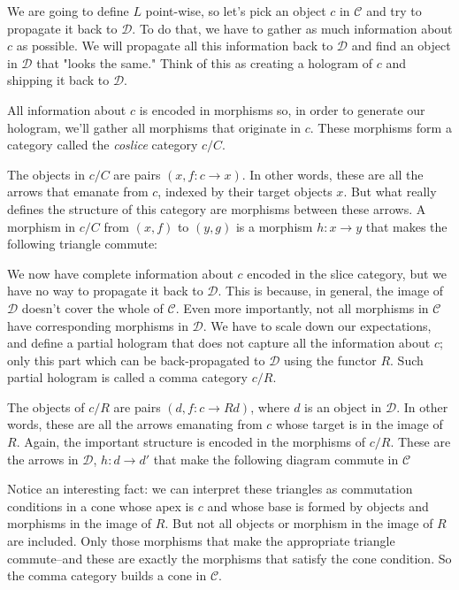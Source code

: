 \documentclass[11pt]{amsart}
\begin{document}
We are going to define $L$ point-wise, so let's pick an object $c$ in $\mathcal C$ and try to propagate it back to $\mathcal D$. To do that, we have to gather as much information about $c$ as possible. We will propagate all this information back to $\mathcal D$ and find an object in $\mathcal D$ that "looks the same." Think of this as creating a hologram of $c$ and shipping it back to $\mathcal D$. 

All information about $c$ is encoded in morphisms so, in order to generate our hologram, we'll gather all morphisms that originate in $c$. These morphisms form a category called the \emph{coslice} category $c/C$. 

The objects in $c/C$ are pairs $(x, f \colon c \to x)$. In other words, these are all the arrows that emanate from $c$, indexed by their target objects $x$. But what really defines the structure of this category are morphisms between these arrows. A morphism in $c/C$ from $(x, f)$ to $(y, g)$ is a morphism $h \colon x \to y$ that makes the following triangle commute:

\begin{figure}[H]
\centering
\end{figure}

We now have complete information about $c$ encoded in the slice category, but we have no way to propagate it back to $\mathcal D$. This is because, in general, the image of $\mathcal D$ doesn't cover the whole of $\mathcal C$. Even more importantly, not all morphisms in $\mathcal C$ have corresponding morphisms in $\mathcal D$. We have to scale down our expectations, and define a partial hologram that does not capture all the information about $c$; only this part which can be back-propagated to $\mathcal D$ using the functor $R$. Such partial hologram is called a comma category $c/R$.

The objects of $c/R$ are pairs $(d, f \colon c \to R d)$, where $d$ is an object in $\mathcal D$. In other words, these are all the arrows emanating from $c$ whose target is in the image of $R$. Again, the important structure is encoded in the morphisms of $c/R$. These are the arrows in $\mathcal D$, $h \colon d \to d'$ that make the following diagram commute in $\mathcal C$

\begin{figure}[H]
\centering
\end{figure}
Notice an interesting fact: we can interpret these triangles as commutation conditions in a cone whose apex is $c$ and whose base is formed by objects and morphisms in the image of $R$. But not all objects or morphism in the image of $R$ are included. Only those morphisms that make the appropriate triangle commute--and these are exactly the morphisms that satisfy the cone condition. So the comma category builds a cone in $\mathcal C$.
\end{document}
